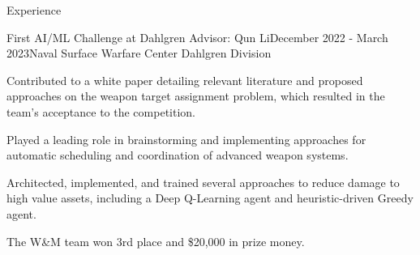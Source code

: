 \documentclass{resume} %
\begin{document}
\begin{rSection}{Experience}
    \begin{rSubsection}{First AI/ML Challenge at Dahlgren} {Advisor: Qun Li}{December 2022 - March 2023}{Naval Surface Warfare Center Dahlgren Division}
        \startitems
        \item Contributed to a white paper detailing relevant literature and proposed approaches on the weapon target assignment problem, which resulted in the team's acceptance to the competition.
        \item Played a leading role in brainstorming and implementing approaches for automatic scheduling and coordination of advanced weapon systems. 
        \item Architected, implemented, and trained several approaches to reduce damage to high value assets, including a Deep Q-Learning agent and heuristic-driven Greedy agent. 
        \item The W\&M team won 3rd place and \$20,000 in prize money. 
    \end{rSubsection}

\end{rSection}
\end{document}
